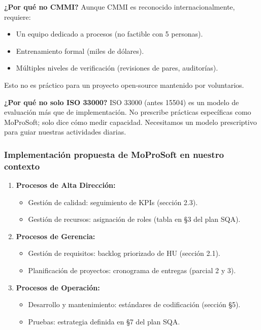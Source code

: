 \documentclass[12pt]{article}
\begin{document}
\textbf{¿Por qué no CMMI?} Aunque CMMI es reconocido internacionalmente, requiere:

\begin{itemize}
    \item Un equipo dedicado a procesos (no factible con 5 personas).
    \item Entrenamiento formal (miles de dólares).
    \item Múltiples niveles de verificación (revisiones de pares, auditorías).
\end{itemize}

Esto no es práctico para un proyecto open-source mantenido por voluntarios.

\textbf{¿Por qué no solo ISO 33000?} ISO 33000 (antes 15504) es un modelo de evaluación más que de implementación. No prescribe prácticas específicas como MoProSoft; solo dice cómo medir capacidad. Necesitamos un modelo prescriptivo para guiar nuestras actividades diarias.

\subsubsection{Implementación propuesta de MoProSoft en nuestro contexto}

\begin{enumerate}
    \item \textbf{Procesos de Alta Dirección:}
    \begin{itemize}
        \item Gestión de calidad: seguimiento de KPIs (sección 2.3).
        \item Gestión de recursos: asignación de roles (tabla en \S 3 del plan SQA).
    \end{itemize}
    
    \item \textbf{Procesos de Gerencia:}
    \begin{itemize}
        \item Gestión de requisitos: backlog priorizado de HU (sección 2.1).
        \item Planificación de proyectos: cronograma de entregas (parcial 2 y 3).
    \end{itemize}
    
    \item \textbf{Procesos de Operación:}
    \begin{itemize}
        \item Desarrollo y mantenimiento: estándares de codificación (sección \S 5).
        \item Pruebas: estrategia definida en \S 7 del plan SQA.
    \end{itemize}
\end{enumerate}
\end{document}

